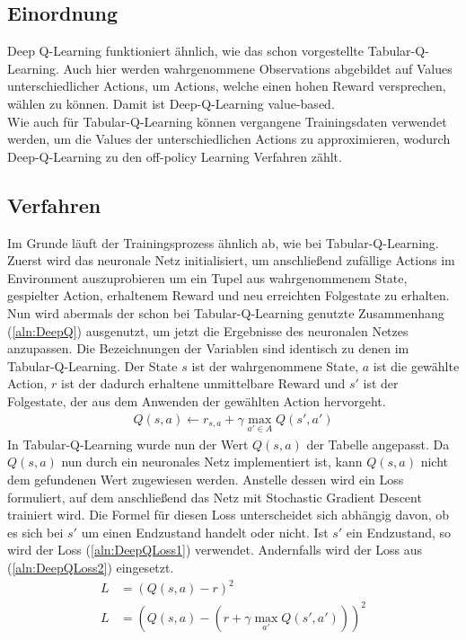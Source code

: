 \documentclass[11pt]{scrartcl}
\begin{document}
\subsection{Einordnung}
Deep Q-Learning funktioniert ähnlich, wie das schon vorgestellte Tabular-Q-Learning. Auch
hier werden wahrgenommene Observations abgebildet auf Values unterschiedlicher Actions, um
Actions, welche einen hohen Reward versprechen, wählen zu können. Damit ist
Deep-Q-Learning value-based.\\
Wie auch für Tabular-Q-Learning können vergangene Trainingsdaten verwendet werden, um die
Values der unterschiedlichen Actions zu approximieren, wodurch Deep-Q-Learning zu den
off-policy Learning Verfahren zählt.

\subsection{Verfahren}
Im Grunde läuft der Trainingsprozess ähnlich ab, wie bei Tabular-Q-Learning. Zuerst wird
das neuronale Netz initialisiert, um anschließend zufällige Actions im Environment
auszuprobieren um ein Tupel aus wahrgenommenem State, gespielter Action, erhaltenem Reward
und neu erreichten Folgestate zu erhalten.\\
Nun wird abermals der schon bei Tabular-Q-Learning genutzte Zusammenhang
(\ref{aln:DeepQ}) ausgenutzt, um jetzt die Ergebnisse des neuronalen Netzes anzupassen.
Die Bezeichnungen der Variablen sind identisch zu denen im Tabular-Q-Learning. Der State
$s$ ist der wahrgenommene State, $a$ ist die gewählte Action, $r$ ist der dadurch
erhaltene unmittelbare Reward und $s'$ ist der Folgestate, der aus dem Anwenden der
gewählten Action hervorgeht.
\begin{align}
  Q(s, a) \leftarrow r_{s,a} + \gamma \max_{a' \in A}Q(s', a') \label{aln:DeepQ}
\end{align}
\noindent
In Tabular-Q-Learning wurde nun der Wert $Q(s, a)$ der Tabelle angepasst. Da $Q(s, a)$
nun durch ein neuronales Netz implementiert ist, kann $Q(s, a)$ nicht dem gefundenen Wert
zugewiesen werden. Anstelle dessen wird ein Loss formuliert, auf dem anschließend das Netz
mit Stochastic Gradient Descent trainiert wird. Die Formel für diesen Loss unterscheidet
sich abhängig davon, ob es sich bei $s'$ um einen Endzustand handelt oder nicht. Ist $s'$
ein Endzustand, so wird der Loss (\ref{aln:DeepQLoss1}) verwendet. Andernfalls wird der
Loss aus (\ref{aln:DeepQLoss2}) eingesetzt.
\begin{align}
  L & = \left(Q(s, a) - r\right)^2 \label{aln:DeepQLoss1} \\
  L & = \left(Q(s, a) - \left(r + \gamma \max_{a'} Q(s', a')\right)\right)^2 \label{aln:DeepQLoss2}
\end{align}
\end{document}
